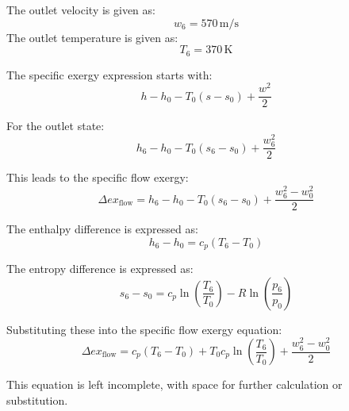 The outlet velocity is given as:  
\[
w_6 = 570 \, \text{m/s}
\]  
The outlet temperature is given as:  
\[
T_6 = 370 \, \text{K}
\]  

The specific exergy expression starts with:  
\[
h - h_0 - T_0 (s - s_0) + \frac{w^2}{2}
\]  

For the outlet state:  
\[
h_6 - h_0 - T_0 (s_6 - s_0) + \frac{w_6^2}{2}
\]  

This leads to the specific flow exergy:  
\[
\Delta ex_{\text{flow}} = h_6 - h_0 - T_0 (s_6 - s_0) + \frac{w_6^2 - w_0^2}{2}
\]  

The enthalpy difference is expressed as:  
\[
h_6 - h_0 = c_p (T_6 - T_0)
\]  

The entropy difference is expressed as:  
\[
s_6 - s_0 = c_p \ln \left( \frac{T_6}{T_0} \right) - R \ln \left( \frac{p_6}{p_0} \right)
\]  

Substituting these into the specific flow exergy equation:  
\[
\Delta ex_{\text{flow}} = c_p (T_6 - T_0) + T_0 c_p \ln \left( \frac{T_6}{T_0} \right) + \frac{w_6^2 - w_0^2}{2}
\]  

This equation is left incomplete, with space for further calculation or substitution.